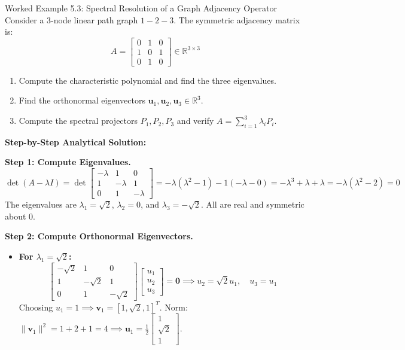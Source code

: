 \begin{examplebox}{Worked Example 5.3: Spectral Resolution of a Graph Adjacency Operator}
\label{ex:w05_graph_adjacency_spectral}
Consider a 3-node linear path graph $1 - 2 - 3$. The symmetric adjacency matrix is:
\begin{equation}
A = \begin{bmatrix} 0 & 1 & 0 \\ 1 & 0 & 1 \\ 0 & 1 & 0 \end{bmatrix} \in \mathbb{R}^{3 \times 3}
\end{equation}
\begin{enumerate}
    \item Compute the characteristic polynomial and find the three eigenvalues.
    \item Find the orthonormal eigenvectors $\mathbf{u}_1, \mathbf{u}_2, \mathbf{u}_3 \in \mathbb{R}^3$.
    \item Compute the spectral projectors $P_1, P_2, P_3$ and verify $A = \sum_{i=1}^3 \lambda_i P_i$.
\end{enumerate}

\tcblower
\textbf{Step-by-Step Analytical Solution:}

\textbf{Step 1: Compute Eigenvalues.}
\begin{equation}
\det(A - \lambda I) = \det\begin{bmatrix} -\lambda & 1 & 0 \\ 1 & -\lambda & 1 \\ 0 & 1 & -\lambda \end{bmatrix} = -\lambda(\lambda^2 - 1) - 1(-\lambda - 0) = -\lambda^3 + \lambda + \lambda = -\lambda(\lambda^2 - 2) = 0
\end{equation}
The eigenvalues are $\lambda_1 = \sqrt{2}$, $\lambda_2 = 0$, and $\lambda_3 = -\sqrt{2}$. All are real and symmetric about 0.

\textbf{Step 2: Compute Orthonormal Eigenvectors.}
\begin{itemize}
    \item \textbf{For $\lambda_1 = \sqrt{2}$:}
    \begin{equation}
    \begin{bmatrix} -\sqrt{2} & 1 & 0 \\ 1 & -\sqrt{2} & 1 \\ 0 & 1 & -\sqrt{2} \end{bmatrix} \begin{bmatrix} u_1 \\ u_2 \\ u_3 \end{bmatrix} = \mathbf{0} \implies u_2 = \sqrt{2} u_1, \quad u_3 = u_1
    \end{equation}
    Choosing $u_1 = 1 \implies \mathbf{v}_1 = [1, \sqrt{2}, 1]^T$. Norm: $\|\mathbf{v}_1\|^2 = 1 + 2 + 1 = 4 \implies \mathbf{u}_1 = \frac{1}{2}\begin{bmatrix} 1 \\ \sqrt{2} \\ 1 \end{bmatrix}$.


\end{itemize}
\end{examplebox}
